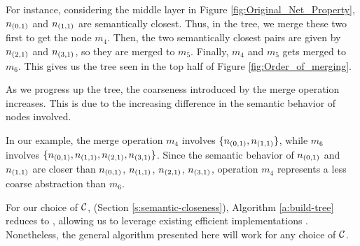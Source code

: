 For instance, considering the middle layer in Figure
\ref{fig:Original_Net_Property}, $n_{(0,1)}$ and $n_{(1,1)}$ are semantically
closest. Thus, in the tree, we merge these two first to get the node $m_4$.
Then, the two semantically closest pairs are given by $n_{(2,1)}$ and
$n_{(3,1)}$, so they are merged to $m_5$. Finally, $m_4$ and $m_5$ gets merged
to $m_6$. This gives us the tree seen in the top half of Figure
\ref{fig:Order_of_merging}.

%
%
%

As we progress up the tree, the coarseness introduced by the 
merge operation increases. 
This is due to the increasing difference in the semantic behavior of nodes
involved. 

In our example, the merge operation
$m_4$ involves $\{n_{(0,1)}, n_{(1,1)}\}$, while $m_6$ involves $\{n_{(0,1)},
n_{(1,1)}, n_{(2,1)}, n_{(3,1)}\}$. Since the semantic behavior of $n_{(0,1)}$
and $n_{(1,1)}$ are closer than $n_{(0,1)}$, $n_{(1,1)}$, $n_{(2,1)}$,
$n_{(3,1)}$, operation $m_4$ represents a less coarse abstraction than $m_6$.

For our choice of $\mathcal{C}$, (Section \ref{s:semantic-closeness}), Algorithm
\ref{a:build-tree} reduces to \hcluster, allowing us to leverage existing
efficient implementations \cite{scipy-hcluster-linkage}. Nonetheless, the
general algorithm presented here will work for any choice of $\mathcal{C}$.

